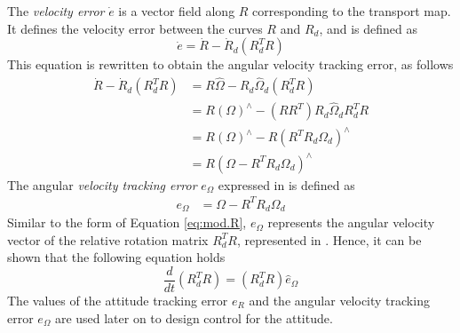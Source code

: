 The \textit{velocity error} $ \dot{e} $ is a vector field along $ R $ corresponding to the transport map.
It defines the velocity error between the curves $ R$ and $ R_d$, and is defined as
\begin{equation}\label{eq:con.dote}
\dot{e}=\dot{R}-\dot{R}_d(R_d^TR)
\end{equation}
This equation is rewritten to obtain the angular velocity tracking error, as follows
\begin{equation}\label{key}
\begin{aligned}
\dot{R}-\dot{R}_d(R_d^TR) &=R\hat{\Omega}-R_d\hat{\Omega}_d(R_d^TR) \\
&=R(\Omega)^\wedge-(RR^T)R_d\hat{\Omega}_dR_d^TR\\
&=R(\Omega)^\wedge-R(R^TR_d{\Omega}_d)^\wedge \\
&=R(\Omega-R^TR_d{\Omega}_d)^\wedge 
\end{aligned}
\end{equation}
The angular \textit{velocity tracking error} $ e_{\Omega} $ expressed in \BF  is defined as
\begin{align}\label{eq:con.eOmega}
e_\Omega&=\Omega- R^TR_d\Omega_d
\end{align}
Similar to the form of Equation \ref{eq:mod.R}, $ e_\Omega $ represents the angular velocity vector of the relative rotation matrix $ R_d^TR $, represented in \BF. Hence, it can be shown that the following equation holds
\begin{equation}\label{key}
\frac{d}{dt}(R^T_dR)=(R_d^TR)\hat{e}_\Omega
\end{equation}
The values of the  attitude tracking error $ e_R $ and the  angular velocity tracking error $ e_\Omega $ 
are used later on to design control for the  attitude.

